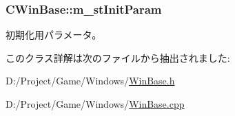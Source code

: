 \subsubsection[{m\+\_\+st\+Init\+Param}]{ C\+Win\+Base\+::m\+\_\+st\+Init\+Param\hspace{0.3cm}{\ttfamily [protected]}}\label{class_c_win_base_abffc43f13e4878d093ffb0014cdad8a4}


初期化用パラメータ。 



このクラス詳解は次のファイルから抽出されました\+:\begin{DoxyCompactItemize}
\item 
D\+:/\+Project/\+Game/\+Windows/\hyperlink{_win_base_8h}{Win\+Base.\+h}\item 
D\+:/\+Project/\+Game/\+Windows/\hyperlink{_win_base_8cpp}{Win\+Base.\+cpp}\end{DoxyCompactItemize}
